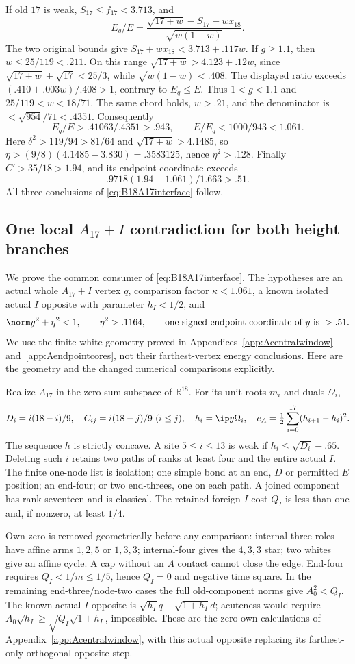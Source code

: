 If old \(17\) is weak, \(S_{17}\leq f_{17}<3.713\), and
\[
 E_q/E=\frac{\sqrt{17+w}-S_{17}-wx_{18}}{\sqrt{w(1-w)}}.
\]
The two original bounds give \(S_{17}+wx_{18}<3.713+.117w\).
If \(g\geq1.1\), then \(w\leq25/119<.211\).
On this range \(\sqrt{17+w}>4.123+.12w\), since
\(\sqrt{17+w}+\sqrt{17}<25/3\), while
\(\sqrt{w(1-w)}<.408\). The displayed ratio exceeds
\((.410+.003w)/.408>1\), contrary to \(E_q\leq E\).
Thus \(1<g<1.1\) and \(25/119<w<18/71\).
The same chord holds, \(w>.21\), and the denominator is
\(<\sqrt{954}/71<.4351\).
Consequently
\[
 E_q/E>.41063/.4351>.943,\qquad E/E_q<1000/943<1.061.
\]
Here \(\delta^2>119/94>81/64\) and
\(\sqrt{17+w}>4.1485\), so
\(\eta>(9/8)(4.1485-3.830)=.3583125\), hence \(\eta^2>.128\).
Finally \(C'>35/18>1.94\), and its endpoint coordinate exceeds
\[
 .9718(1.94-1.061)/1.663>.51 .
\]
All three conclusions of \eqref{eq:B18A17interface} follow.

\subsection{One local \(A_{17}+I\) contradiction for both height branches}
\label{app:B18localA17}
We prove the common consumer of \eqref{eq:B18A17interface}.
The hypotheses are an actual whole \(A_{17}+I\) vertex \(q\),
comparison factor \(\kappa<1.061\), a known isolated actual \(I\)
opposite with parameter \(h_I<1/2\), and
\[
 \norm y^2+\eta^2<1,\qquad \eta^2>.1164,\qquad
 \text{one signed endpoint coordinate of \(y\) is }>.51 .
\]
We use the finite-white geometry proved in
Appendices~\ref{app:Acentralwindow} and~\ref{app:Aendpointcores},
not their farthest-vertex energy conclusions.
Here are the geometry and the changed numerical comparisons explicitly.

Realize \(A_{17}\) in the zero-sum subspace of \(\mathbb R^{18}\).
For its unit roots \(m_i\) and duals \(\Omega_i\),
\[
 D_i=i(18-i)/9,\quad C_{ij}=i(18-j)/9\ (i\leq j),\quad
 h_i=\ip y{\Omega_i},\quad
 e_A=\tfrac12\sum_{i=0}^{17}(h_{i+1}-h_i)^2 .
\]
The sequence \(h\) is strictly concave.
A site \(5\leq i\leq13\) is weak if \(h_i\leq\sqrt{D_i}-.65\).
Deleting such \(i\) retains two paths of ranks at least four and
the entire actual \(I\). The finite one-node list is isolation;
one simple bond at an end, \(D\) or permitted \(E\) position;
an end-four; or two end-threes, one on each path.
A joined component has rank seventeen and is classical.
The retained foreign \(I\) cost \(Q_I\) is less than one and,
if nonzero, at least \(1/4\).

Own zero is removed geometrically before any comparison:
internal-three roles have affine arms \(1,2,5\) or \(1,3,3\);
internal-four gives the \(4,3,3\) star; two whites give an affine
cycle. A cap without an \(A\) contact cannot close the edge.
End-four requires \(Q_I<1/m\leq1/5\), hence \(Q_I=0\) and
negative time square. In the remaining end-three/node-two cases
the full old-component norms give \(A_0^2<Q_I\).
The known actual \(I\) opposite is
\(\sqrt{h_I}q-\sqrt{1+h_I}d\); acuteness would require
\(A_0\sqrt{h_I}\geq\sqrt{Q_I}\sqrt{1+h_I}\), impossible.
These are the zero-own calculations of
Appendix~\ref{app:Acentralwindow}, with this actual opposite
replacing its farthest-only orthogonal-opposite step.

